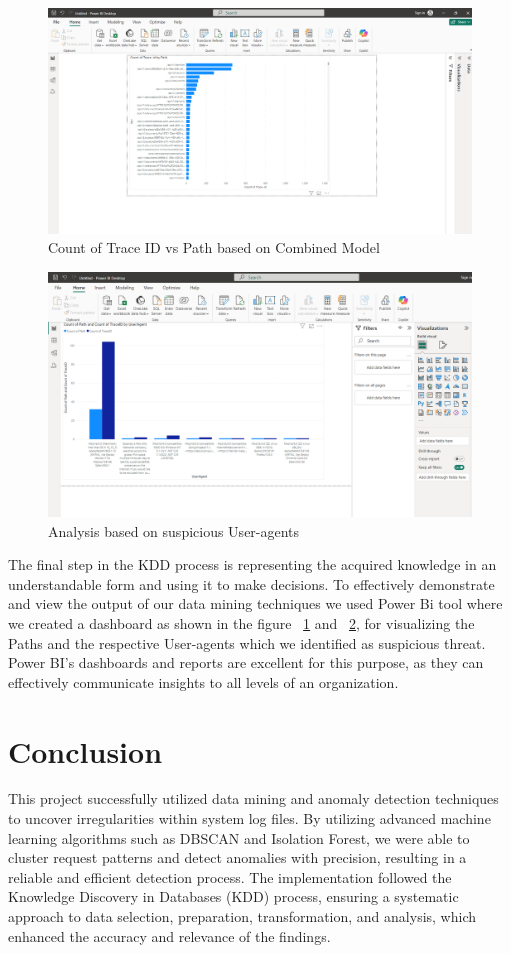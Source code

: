 \begin{figure}
	\begin{center}
		\includegraphics[width=0.7\linewidth]{Images/PowerBI_1.png}
		\caption{Count of Trace ID vs Path based on Combined Model}
		\label{PowerBI1} 
	\end{center}
\end{figure}

\begin{figure}
	\begin{center}
		\includegraphics[width=0.7\linewidth]{Images/PowerBI_2.png}
		\caption{Analysis based on suspicious User-agents}
		\label{PowerBI2} 
	\end{center}
\end{figure}

The final step in the KDD process is representing the acquired knowledge
in an understandable form and using it to make decisions. To effectively demonstrate and view the output of our data mining techniques we used Power Bi tool where we created a dashboard as shown in the figure ~\ref{PowerBI1} and ~\ref{PowerBI2}, for visualizing the Paths and the respective User-agents which we identified as suspicious threat. Power BI's dashboards and reports are excellent for this purpose, as they can effectively communicate insights to all levels of an organization.

\section{Conclusion}
This project successfully utilized data mining and anomaly detection techniques to uncover irregularities within system log files. By utilizing advanced machine learning algorithms such as DBSCAN and Isolation Forest, we were able to cluster request patterns and detect anomalies with precision, resulting in a reliable and efficient detection process. The implementation followed the Knowledge Discovery in Databases (KDD) process, ensuring a systematic approach to data selection, preparation,  transformation, and analysis, which enhanced the accuracy and relevance of the findings.
